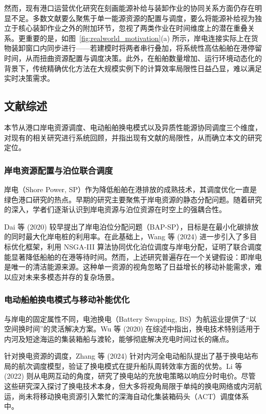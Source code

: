 \documentclass[UTF8, a4paper, 12pt]{ctexart}
\begin{document}
然而，现有港口运营优化研究在刻画能源补给与装卸作业的协同关系方面仍存在明显不足。多数文献要么聚焦于单一能源资源的配置与调度，要么将能源补给视为独立于核心装卸作业之外的附加环节，忽视了两类作业在时间维度上的潜在重叠关系。更重要的是，如图~\ref{fig:realworld_motivation}(a) 所示，岸电连接实际上在货物装卸窗口内同步进行——若建模时将两者串行叠加，将系统性高估船舶在港停留时间，从而扭曲资源配置与调度决策。此外，在船舶数量增加、运行环境动态化的背景下，传统精确优化方法在大规模实例下的计算效率局限性日益凸显，难以满足实时决策需求。

\subsection{文献综述}
\label{sec:lit_review}

本节从港口岸电资源调度、电动船舶换电模式以及异质性能源协同调度三个维度，对现有的相关研究进行系统回顾，并指出现有文献的局限性，从而确立本文的研究定位。

\subsubsection{岸电资源配置与泊位联合调度}
岸电（Shore Power, SP）作为降低船舶在港排放的成熟技术，其调度优化一直是绿色港口研究的热点。早期的研究主要聚焦于岸电资源的静态分配问题。随着研究的深入，学者们逐渐认识到岸电资源与泊位资源在时空上的强耦合性。

Dai 等 (2020) \cite{Dai2020} 较早提出了岸电泊位分配问题（BAP-SP），目标是在最小化碳排放的同时最大化岸电桩的利用率。在此基础上，Wang 等 (2024) \cite{Wang2024_SP} 进一步引入了多目标优化框架，利用 NSGA-III 算法协同优化泊位调度与岸电分配，证明了联合调度能显著降低船舶的在港等待时间。然而，上述研究普遍存在一个关键假设：即岸电是唯一的清洁能源来源。这种单一资源的视角忽略了日益增长的移动补能需求，难以应对未来多模态并存的复杂场景。

\subsubsection{电动船舶换电模式与移动补能优化}
与岸电的固定属性不同，电池换电（Battery Swapping, BS）为航运业提供了“以空间换时间”的灵活解决方案。Wu 等 (2020) \cite{Wu2020_Review} 在综述中指出，换电技术特别适用于内河及短途海运的集装箱船与渡轮，能够彻底解决充电时间过长的痛点。

针对换电资源的调度，Zhang 等 (2024) \cite{Zhang2024_Voyage} 针对内河全电动船队提出了基于换电站布局的航次调度模型，验证了换电模式在提升船队周转效率方面的优势。Li 等 (2022) \cite{Li2022_BSS} 则从电网互动的角度，研究了换电站的充放电策略以响应分时电价。尽管这些研究深入探讨了换电技术本身，但大多将视角局限于单纯的换电网络或内河航运，尚未将移动换电资源引入繁忙的深海自动化集装箱码头（ACT）调度体系中。
\end{document}
